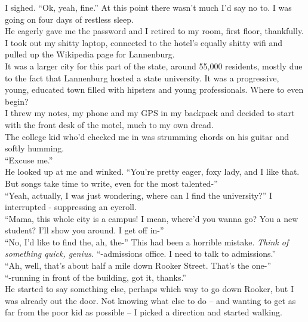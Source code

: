 \documentclass[a5paper]{scrartcl}
\begin{document}
I sighed. \enquote{Ok, yeah, fine.} At this point there wasn't much I'd say no to. I was going on four days of restless sleep.\\


He eagerly gave me the password and I retired to my room, first floor, thankfully. I took out my shitty laptop, connected to the hotel's equally shitty wifi and pulled up the Wikipedia page for Lannenburg.\\


It was a larger city for this part of the state, around 55,000 residents, mostly due to the fact that Lannenburg hosted a state university. It was a progressive, young, educated town filled with hipsters and young professionals. Where to even begin?\\


I threw my notes, my phone and my GPS in my backpack and decided to start with the front desk of the motel, much to my own dread.\\


The college kid who'd checked me in was strumming chords on his guitar and softly humming.\\


\enquote{Excuse me.}\\


He looked up at me and winked. \enquote{You're pretty eager, foxy lady, and I like that. But songs take time to write, even for the most talented-}\\


\enquote{Yeah, actually, I was just wondering, where can I find the university?} I interrupted - suppressing an eyeroll.\\


\enquote{Mama, this whole city is a campus! I mean, where'd you wanna go? You a new student? I'll show you around. I get off in-}\\


\enquote{No, I'd like to find the, ah, the-} This had been a horrible mistake. \textit{Think of something quick, genius.}
 \enquote{-admissions office. I need to talk to admissions.}\\


\enquote{Ah, well, that's about half a mile down Rooker Street. That's the one-}\\


\enquote{-running in front of the building, got it, thanks.}\\


He started to say something else, perhaps which way to go down Rooker, but I was already out the door. Not knowing what else to do -- and wanting to get as far from the poor kid as possible -- I picked a direction and started walking.\\
\end{document}
